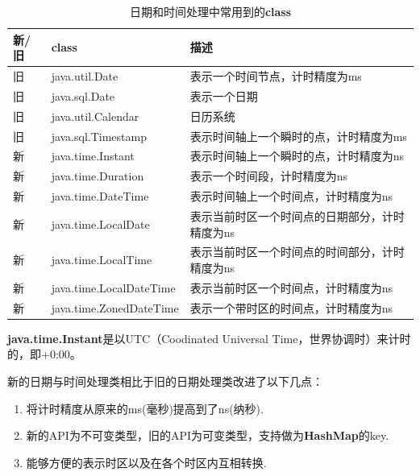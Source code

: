 \documentclass[cn,10pt,math=newtx,citestyle=gb7714-2015,bibstyle=gb7714-2015]{elegantbook}
\begin{document}
    \begin{table}[htbp]
        \centering
        \caption{日期和时间处理中常用到的\textbf{class}}
        \begin{tabular}{p{}p{}p{}}
            \toprule
                新/旧 & class & 描述 \\
            \midrule    
               旧 & java.util.Date & 表示一个时间节点，计时精度为ms \\
               旧 & java.sql.Date & 表示一个日期 \\
               旧 & java.util.Calendar & 日历系统 \\
               旧 & java.sql.Timestamp & 表示时间轴上一个瞬时的点，计时精度为ms \\
               新 & java.time.Instant & 表示时间轴上一个瞬时的点，计时精度为ns \\
               新 & java.time.Duration & 表示一个时间段，计时精度为ns \\
               新 & java.time.DateTime & 表示时间轴上一个时间点，计时精度为ns \\
               新 & java.time.LocalDate & 表示当前时区一个时间点的日期部分，计时精度为ns \\
               新 & java.time.LocalTime & 表示当前时区一个时间点的时间部分，计时精度为ns \\
               新 & java.time.LocalDateTime & 表示当前时区一个时间点，计时精度为ns \\
               新 & java.time.ZonedDateTime & 表示一个带时区的时间点，计时精度为ns \\
            \bottomrule
        \end{tabular}
    \end{table}

    \begin{note}
        \textbf{java.time.Instant}是以UTC（Coodinated Universal Time，世界协调时）来计时的，即+0:00。
    \end{note}

    新的日期与时间处理类相比于旧的日期处理类改进了以下几点：

    \begin{enumerate}
        \item 将计时精度从原来的ms(毫秒)提高到了ns(纳秒).
        \item 新的API为不可变类型，旧的API为可变类型，支持做为\textbf{HashMap}的key.
        \item 能够方便的表示时区以及在各个时区内互相转换.
    \end{enumerate}
\end{document}
